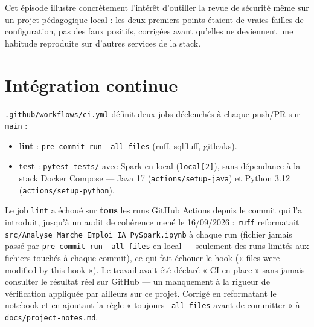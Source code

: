 Cet épisode illustre concrètement l'intérêt d'outiller la revue de
sécurité même sur un projet pédagogique local : les deux premiers
points étaient de vraies failles de configuration, pas des faux
positifs, corrigées avant qu'elles ne deviennent une habitude reproduite
sur d'autres services de la stack.

\section{Intégration continue}

\texttt{.github/workflows/ci.yml} définit deux jobs déclenchés à chaque
push/PR sur \texttt{main} :

\begin{itemize}[leftmargin=1.5em]
  \item \textbf{lint} : \texttt{pre-commit run --all-files} (ruff,
    sqlfluff, gitleaks).
  \item \textbf{test} : \texttt{pytest tests/} avec Spark en local
    (\texttt{local[2]}), sans dépendance à la stack Docker Compose —
    Java 17 (\texttt{actions/setup-java}) et Python 3.12
    (\texttt{actions/setup-python}).
\end{itemize}

\begin{constat}
Le job \texttt{lint} a échoué sur \textbf{tous} les runs GitHub Actions
depuis le commit qui l'a introduit, jusqu'à un audit de cohérence mené
le 16/09/2026 : \texttt{ruff} reformatait
\texttt{src/Analyse\_Marche\_Emploi\_IA\_PySpark.ipynb} à chaque run
(fichier jamais passé par \texttt{pre-commit run --all-files} en local
— seulement des runs limités aux fichiers touchés à chaque commit), ce
qui fait échouer le hook (« files were modified by this hook »). Le
travail avait été déclaré « CI en place » sans jamais consulter le
résultat réel sur GitHub — un manquement à la rigueur de vérification
appliquée par ailleurs sur ce projet. Corrigé en reformatant le
notebook et en ajoutant la règle « toujours \texttt{--all-files} avant
de committer » à \texttt{docs/project-notes.md}.
\end{constat}
